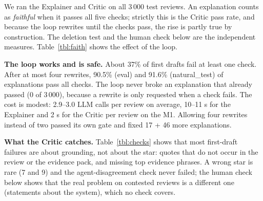 \documentclass[runningheads]{llncs}
\begin{document}
We ran the Explainer and Critic on all 3\,000 test reviews. An explanation counts as \emph{faithful} when it passes all five checks; strictly this is the Critic pass rate, and because the loop rewrites until the checks pass, the rise is partly true by construction. The deletion test and the human check below are the independent measures. Table~\ref{tbl:faith} shows the effect of the loop.

\begin{table}[t]
\centering
\caption{Explanations on all 3\,000 test reviews. Pass = passes all five Critic checks (the Critic pass rate). Fixed / broken = reviews whose explanation went from failing to passing, or from passing to failing, between the first draft and the final one. Deletion test: drop in the system's probability of its star when the cited phrases are removed (comprehensiveness), and probability when only they are kept (sufficiency), against the same number of random words.}
\label{tbl:faith}
\small
{}
\end{table}

\textbf{The loop works and is safe.} About 37\% of first drafts fail at least one check. After at most four rewrites, 90.5\% (eval) and 91.6\% (natural\_test) of explanations pass all checks. The loop never broke an explanation that already passed (0 of 3\,000), because a rewrite is only requested when a check fails. The cost is modest: 2.9--3.0 LLM calls per review on average, 10--11 s for the Explainer and 2 s for the Critic per review on the M1. Allowing four rewrites instead of two passed its own gate and fixed 17 + 46 more explanations.

\textbf{What the Critic catches.} Table~\ref{tbl:checks} shows that most first-draft failures are about grounding, not about the star: quotes that do not occur in the review or the evidence pack, and missing top evidence phrases. A wrong star is rare (7 and 9) and the agent-disagreement check never failed; the human check below shows that the real problem on contested reviews is a different one (statements about the system), which no check covers.
\end{document}
